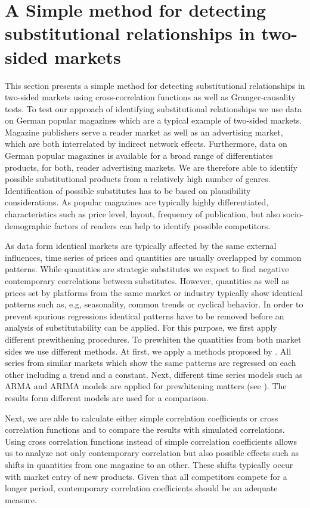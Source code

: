 \documentclass[12pt,a4paper]{scrreprt}
\begin{document}
\section{A Simple method for detecting substitutional relationships in two-sided markets}

This section presents a simple method for detecting substitutional relationships in two-sided markets using cross-correlation functions as well as Granger-causality tests. To test our approach of identifying substitutional relationships we use data on German popular magazines which are a typical example of two-sided markets. Magazine publishers serve a reader market as well as an advertising market, which are both interrelated by indirect network effects. Furthermore, data on German popular magazines is available for a broad range of differentiates products, for both, reader advertising markets. We are therefore able to identify possible substitutional products from a relatively high number of genres. Identification of possible substitutes has to be based on plausibility considerations. As popular magazines are typically highly differentiated, characteristics such as price level, layout, frequency of publication, but also socio-demographic factors of readers can help to identify possible competitors.  

As data form identical markets are typically affected by the same external influences, time series of prices and quantities are usually overlapped by common patterns. While quantities are strategic substitutes we expect to find negative contemporary correlations between substitutes. However, quantities as well as prices set by platforms from the same market or industry typically show identical patterns such as, e.g, seasonality, common trends or cyclical behavior. In order to prevent spurious regressions identical patterns have to be removed before an analysis of substitutability can be applied. For this purpose, we first apply different prewithening procedures. To prewhiten the quantities from both market sides we use different methods. At first, we apply a methods proposed by \cite{dewenter_essays_2004}. All series from similar markets which show the same patterns are regressed on each other including a trend and a constant. Next, different time series models such as ARMA and ARIMA models are applied for prewhitening matters (see \cite{box_time_2008}). The results form different models are used for a comparison.

Next, we are able to calculate either simple correlation coefficients or cross correlation functions and to compare the results with simulated correlations. Using cross correlation functions instead of simple correlation coefficients allows us to analyze not only contemporary correlation but also possible effects such as shifts in quantities from one magazine to an other. These shifts typically occur with market entry of new products. Given that all competitors compete for a longer period, contemporary correlation coefficients should be an adequate measure. 
\end{document}
